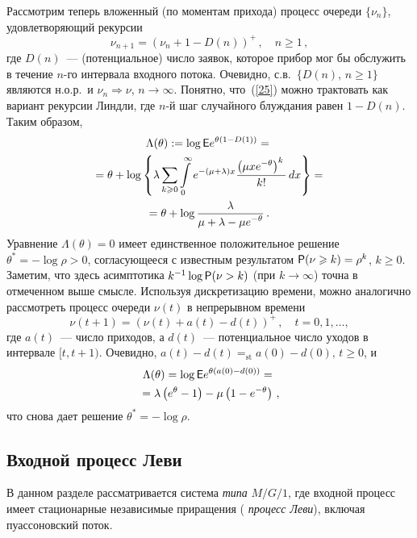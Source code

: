 \begin{multicols}{2}
Рассмотрим теперь вложенный (по моментам прихода) процесс очереди $\{\nu_n\}$, удовлетворяющий рекурсии
\begin{equation}
\nu_{n+1}=(\nu_n+1-D(n))^+\,,\quad n\ge 1\,,
\label{25}
\end{equation}
где $D(n)$~--- (потенциальное) число заявок, которое прибор мог бы
обслужить в течение $n$-го интервала входного потока. Очевидно, с.в.\
$\{D(n),\,n\ge 1\}$ являются н.о.р.\ и $\nu_n\Rightarrow \nu$, $n\to \infty$. Понятно, что~(\ref{25}) можно
трактовать как вариант рекурсии Линдли, где $n$-й шаг случайного блуждания равен $1-D(n)$.
Таким образом,
\begin{multline*}
\Lambda(\theta):= \log {\sf E} e ^{\theta(1-D(1))} ={}\\
{}=\theta+\log \left
\{\lambda\sum\limits_{k\geqslant 0}\int\limits_0^\infty e^{-(\mu+\lambda)x}
\displaystyle\frac{\displaystyle \left(\mu x e^{-\theta}\right)^k \mathstrut}{\displaystyle k!\mathstrut}\,dx\right\}={}\\
=\theta+\log \displaystyle\frac{\displaystyle \lambda\mathstrut}{\displaystyle \mu+\lambda-\mu e^{-\theta}\mathstrut}\,.
\end{multline*}
Уравнение $\Lambda(\theta)=0$ имеет единственное положительное
решение $\theta^*=-\log \rho>0$, согласующееся с известным
результатом ${\sf P} (\nu\geqslant k)=\rho^k$, $k\ge0$. Заметим, что здесь
асимптотика $k^{-1}\log{\sf P}(\nu>k)$ (при $k\to \infty$) точна в
отмеченном выше смысле. Используя дискретизацию времени, можно аналогично рассмотреть процесс очереди $\nu(t)$
в непрерывном времени
\begin{equation*}
 \nu(t+1)=(\nu(t)+a(t)-d(t))^+\,,\quad t=0,1,\ldots,
\end{equation*}
где $a(t)$~--- число приходов, а $d(t)$~--- потенциальное число уходов в интервале $[t,t+1)$. Очевидно,
$a(t)-d(t)=_{\mathrm{st}}a(0)-d(0),\,t\ge 0$, и
\begin{multline}
\Lambda(\theta)=\log {\sf E} e^{\theta (a(0)-d(0))} ={}\\
{}=\lambda \left(e^{\theta}-1\right)- \mu \left(1-e^{-\theta}\right)\,,
\label{2.5}
\end{multline}
что снова дает решение $\theta^*= -\log\rho$.

\subsection{Входной процесс Леви}

В данном разделе рассматривается система {\it типа } $M/G/1$,
где входной процесс имеет стационарные независимые приращения ({\it
процесс Леви}), включая пуассоновский поток.


\end{multicols}
